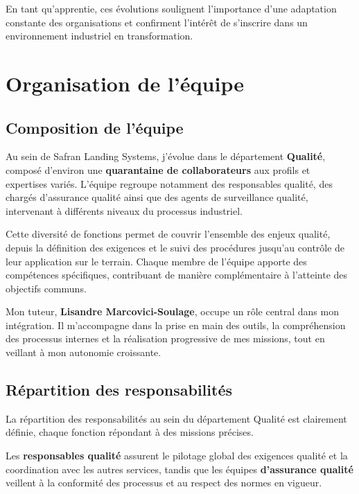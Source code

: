 \noindent En tant qu’apprentie, ces évolutions soulignent l’importance d’une adaptation constante des organisations et confirment l’intérêt de s’inscrire dans un environnement industriel en transformation.

\section*{Organisation de l'équipe}

\subsection*{Composition de l'équipe}
{}
Au sein de Safran Landing Systems, j’évolue dans le département \textbf{Qualité}, composé d’environ une \textbf{quarantaine de collaborateurs} aux profils et expertises variés. L’équipe regroupe notamment des responsables qualité, des chargés d’assurance qualité ainsi que des agents de surveillance qualité, intervenant à différents niveaux du processus industriel.

\noindent Cette diversité de fonctions permet de couvrir l’ensemble des enjeux qualité, depuis la définition des exigences et le suivi des procédures jusqu’au contrôle de leur application sur le terrain. Chaque membre de l’équipe apporte des compétences spécifiques, contribuant de manière complémentaire à l’atteinte des objectifs communs.

\newpage

\noindent Mon tuteur, \textbf{Lisandre Marcovici-Soulage}, occupe un rôle central dans mon intégration. Il m’accompagne dans la prise en main des outils, la compréhension des processus internes et la réalisation progressive de mes missions, tout en veillant à mon autonomie croissante.

\subsection*{Répartition des responsabilités}
{}
La répartition des responsabilités au sein du département Qualité est clairement définie, chaque fonction répondant à des missions précises. 

\noindent Les \textbf{responsables qualité} assurent le pilotage global des exigences qualité et la coordination avec les autres services, tandis que les équipes \textbf{d’assurance qualité} veillent à la conformité des processus et au respect des normes en vigueur.

